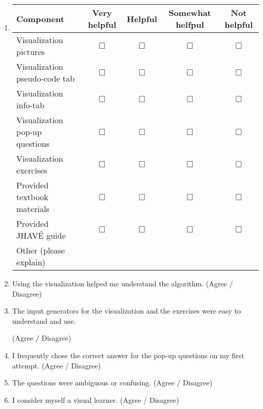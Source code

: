 \documentclass[letter]{article}
\begin{document}
\begin{enumerate}
\item
\begin{tabular}{| l | c | c | c | c |}
\hline
\textbf{Component} & \textbf{Very helpful} & \textbf{Helpful} & \textbf{Somewhat helfpul} & \textbf{Not helpful} \\
\hline
Visualization pictures & $\Box$ & $\Box$ & $\Box$ & $\Box$ \\
\hline
Visualization pseudo-code tab & $\Box$ & $\Box$ & $\Box$ & $\Box$ \\
\hline
Visualization info-tab & $\Box$ & $\Box$ & $\Box$ & $\Box$ \\
\hline
Visualization pop-up questions & $\Box$ & $\Box$ & $\Box$ & $\Box$ \\
\hline
Visualization exercises & $\Box$ & $\Box$ & $\Box$ & $\Box$ \\
\hline
Provided textbook materials & $\Box$ & $\Box$ & $\Box$ & $\Box$ \\
\hline
Provided JHAVÉ guide & $\Box$ & $\Box$ & $\Box$ & $\Box$ \\
\hline
Other (please explain) &&&&\\ %
\hline
\end{tabular}

\addtocounter{enumi}{7}%

\item Using the visualization helped me understand the algorithm.
(Agree / Disagree)

\item The input generators for the visualization and the exercises were easy to understand and use.

(Agree / Disagree)

\item I frequently chose the correct answer for the pop-up questions on my first attempt.
(Agree / Disagree)

\item The questions were ambiguous or confusing.
(Agree / Disagree)


\item I consider myself a visual learner.
(Agree / Disagree)



\end{enumerate}
\end{document}
